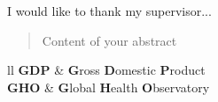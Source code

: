 \documentclass[
11pt, %
oneside, %
english, %
singlespacing, %
liststotoc, %
]{MastersDoctoralThesis} %
\begin{document}



\begin{acknowledgements}
	I would like to thank my supervisor...

\end{acknowledgements}



\begin{abstract}
\addchaptertocentry{\abstractname} %

Content of your abstract

\vfill
\keywordnames
\end{abstract}

\tableofcontents %
\listoffigures %
\listoftables %


\begin{abbreviations}{ll} %
\textbf{GDP} & \textbf{G}ross \textbf{D}omestic \textbf{P}roduct \\
\textbf{GHO} & \textbf{G}lobal \textbf{H}ealth \textbf{O}bservatory \\

\end{abbreviations}
\end{document}
